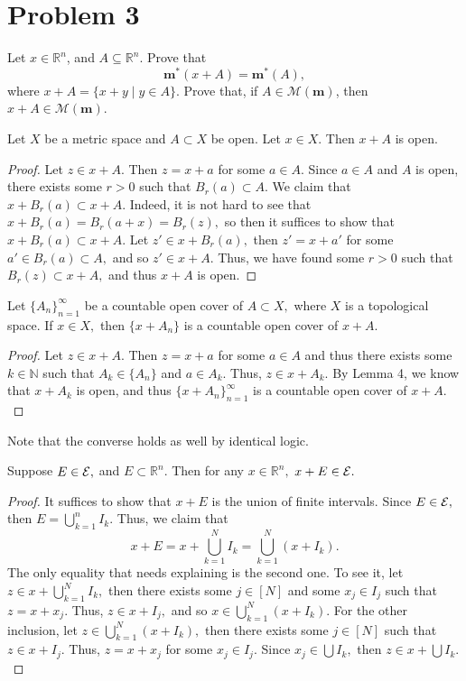 \documentclass[11pt]{article}
\newcommand{\bbN}{\mathbb{N}}
\newcommand{\bbR}{\mathbb{R}}
\begin{document}
\newpage
\section*{Problem 3}
\begin{problem}
    Let $x \in \mathbb{R}^n$, and $A \subseteq \mathbb{R}^n$. Prove that
\[
\mathbf{m}^*(x + A) = \mathbf{m}^*(A),
\]
where $x + A = \{x + y \mid y \in A\}$. Prove that, if $A \in \mathcal{M}(\mathbf{m})$, then $x + A \in \mathcal{M}(\mathbf{m})$.
\end{problem}
\begin{solution}
    \begin{lemma}
    Let $X$ be a metric space and $A \subset X$ be open. Let $x\in X.$ Then $x + A$ is open.
    \end{lemma}
    \begin{proof}
        Let $z \in x + A.$ Then $z = x + a$ for some $a \in A.$ Since $a \in A$ and $A$ is open, there exists some $r>0$ such that $B_r(a)\subset A.$ We claim that $x + B_r(a) \subset x + A.$ Indeed, it is not hard to see that $x + B_r(a) = B_r(a + x) = B_r(z),$ so then it suffices to show that $x + B_r(a) \subset x + A.$ Let $z' \in x + B_r(a),$ then $z' = x + a'$ for some $a' \in B_r(a) \subset A,$ and so $z' \in x + A.$ Thus, we have found some $r>0$ such that $B_r(z)\subset x + A,$ and thus $x + A$ is open.
    \end{proof}
    \begin{lemma}
        Let $\{A_n\}_{n =1}^\infty$ be a countable open cover of $A \subset X,$ where $X$ is a topological space. If $x \in X,$ then $\{x + A_n\}$ is a countable open cover of $x + A.$
    \end{lemma}
    \begin{proof}
        Let $z \in x + A.$ Then $z = x + a$ for some $a\in A$ and thus there exists some $k \in \bbN$ such that $A_k \in \{A_n\}$ and $a \in A_k.$ Thus, $z\in x + A_k.$ By Lemma 4, we know that $x + A_k$ is open, and thus $\{x + A_n\}_{n =1}^\infty$ is a countable open cover of $x + A.$
    \end{proof}
    Note that the converse holds as well by identical logic.
    \begin{lemma}
     Suppose $E \in \cal E,$ and $E \subset \bbR^n.$ Then for any $x\in \bbR^n,$ $x + E \in \cal E.$
    \end{lemma}
    \begin{proof}
        It suffices to show that $x + E$ is the union of finite intervals. Since $E \in \cal E,$ then $E = \bigcup_{k=1}^n I_k.$ Thus, we claim that
        \[x + E = x + \bigcup_{k=1}^N I_k = \bigcup_{k=1}^N(x + I_k).\] The only equality that needs explaining is the second one. To see it, let $z \in x + \bigcup_{k=1}^N I_k,$ then there exists some $j \in [N]$ and some $x_j \in I_j$ such that $z = x + x_j.$ Thus, $z \in x + I_j,$ and so $x \in \bigcup_{k=1}^N (x + I_k).$ For the other inclusion, let $z\in \bigcup_{k=1}^N (x + I_k),$ then there exists some $j \in [N]$ such that $z\in x + I_j.$ Thus, $z = x + x_j$ for some $x_j \in I_j.$ Since $x_j \in \bigcup I_k,$ then $z \in x + \bigcup I_k.$
        

\end{proof}
\end{solution}
\end{document}
